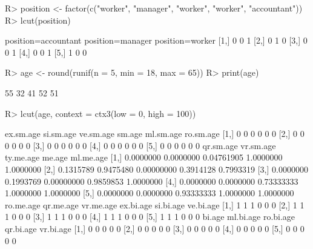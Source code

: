 \documentclass{article}\usepackage[]{graphicx}\usepackage[]{color}
\begin{document}
\begin{Schunk}
% --begin: "lcut.factor"
\begin{Sinput}
R> position <- factor(c("worker", "manager", "worker", "worker", "accountant"))
R> lcut(position)
\end{Sinput}
\begin{Soutput}
     position=accountant position=manager position=worker
[1,]                   0                0               1
[2,]                   0                1               0
[3,]                   0                0               1
[4,]                   0                0               1
[5,]                   1                0               0
\end{Soutput}
%
% --end: "lcut.factor"
\end{Schunk}

\begin{Schunk}
% --begin: "lcut.numeric"
\begin{Sinput}
R> age <- round(runif(n = 5, min = 18, max = 65))
R> print(age)
\end{Sinput}
\begin{Soutput}
[1] 55 32 41 52 51
\end{Soutput}
\begin{Sinput}
R> lcut(age, context = ctx3(low = 0, high = 100))
\end{Sinput}
\begin{Soutput}
     ex.sm.age si.sm.age ve.sm.age sm.age ml.sm.age ro.sm.age
[1,]         0         0         0      0         0         0
[2,]         0         0         0      0         0         0
[3,]         0         0         0      0         0         0
[4,]         0         0         0      0         0         0
[5,]         0         0         0      0         0         0
     qr.sm.age vr.sm.age  ty.me.age    me.age ml.me.age
[1,] 0.0000000 0.0000000 0.04761905 1.0000000 1.0000000
[2,] 0.1315789 0.9475480 0.00000000 0.3914128 0.7993319
[3,] 0.0000000 0.1993769 0.00000000 0.9859853 1.0000000
[4,] 0.0000000 0.0000000 0.73333333 1.0000000 1.0000000
[5,] 0.0000000 0.0000000 0.93333333 1.0000000 1.0000000
     ro.me.age qr.me.age vr.me.age ex.bi.age si.bi.age ve.bi.age
[1,]         1         1         1         0         0         0
[2,]         1         1         1         0         0         0
[3,]         1         1         1         0         0         0
[4,]         1         1         1         0         0         0
[5,]         1         1         1         0         0         0
     bi.age ml.bi.age ro.bi.age qr.bi.age vr.bi.age
[1,]      0         0         0         0         0
[2,]      0         0         0         0         0
[3,]      0         0         0         0         0
[4,]      0         0         0         0         0
[5,]      0         0         0         0         0
\end{Soutput}
%
% --end: "lcut.numeric"
\end{Schunk}
\end{document}
